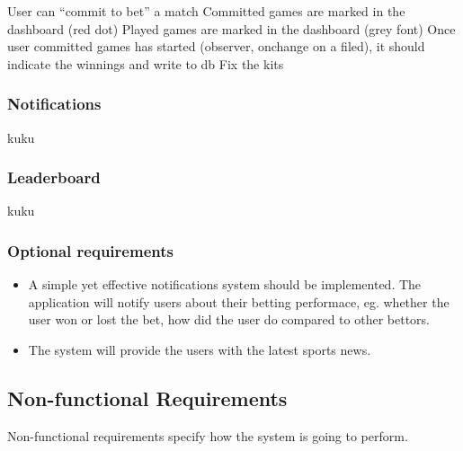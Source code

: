 User can “commit to bet” a match 
Committed games are marked in the dashboard (red dot)
Played games are marked in the dashboard (grey font)
Once user committed games has started (observer, onchange on a filed), it should indicate the winnings and write to db
Fix the kits

\subsubsection{Notifications}
\label{subsubsec:notifications_req}
kuku

\subsubsection{Leaderboard}
\label{subsubsec:leaderboard_req}
kuku

\subsubsection{Optional requirements}
\label{sec:optional_req}

\begin{itemize}
	\item A simple yet effective notifications system should be implemented. The application will notify users about their betting performace, eg. whether the user won or lost the bet, how did the user do compared to other bettors.
	\item The system will provide the users with the latest sports news.
\end{itemize}

\subsection{Non-functional Requirements}
\label{sec:nonfunctional_req}

Non-functional requirements specify how the system is going to perform. 

